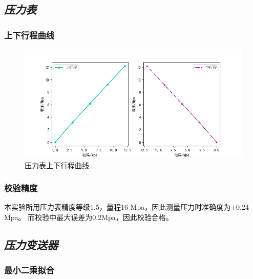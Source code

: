 \documentclass[UTF8]{article}
\begin{document}
	\subsection{\textit{压力表}}
	\subsubsection{上下行程曲线}
	\begin{figure}[H]
		\centering
		\includegraphics[width=0.7\linewidth]{Figure_1}
		\caption{压力表上下行程曲线}
		\label{fig:figure1}
	\end{figure}
	\subsubsection{校验精度}
	
	本实验所用压力表精度等级1.5，量程16 Mpa，因此测量压力时准确度为$\pm0.24$ Mpa。 而校验中最大误差为0.2Mpa，因此校验合格。
	\subsection{\textit{压力变送器}}
	
	\subsubsection{最小二乘拟合}
	
\end{document}
